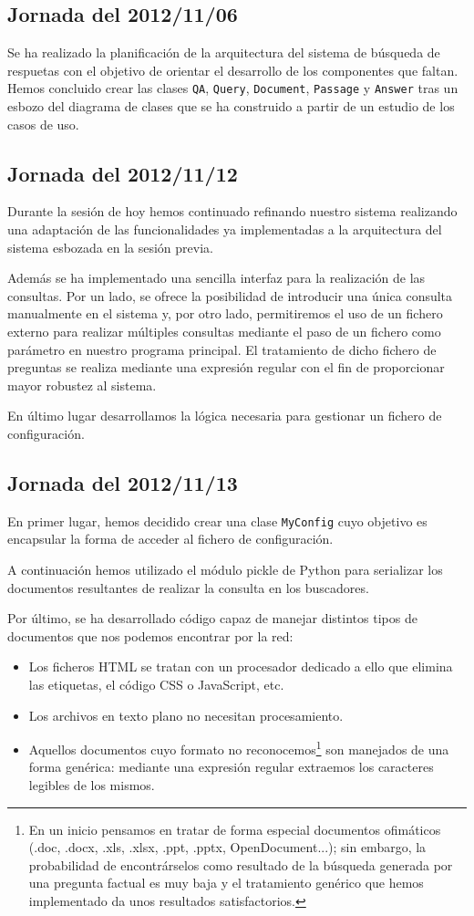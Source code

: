 \documentclass[12pt,a4paper,titlepage]{article}
\begin{document}
\subsection{Jornada del 2012/11/06}
Se ha realizado la planificación de la arquitectura del sistema de búsqueda de respuetas con el objetivo de orientar el desarrollo de los componentes que faltan. Hemos concluido crear las clases \texttt{QA}, \texttt{Query}, \texttt{Document}, \texttt{Passage} y \texttt{Answer} tras un esbozo del diagrama de clases que se ha construido a partir de un estudio de los casos de uso.

\subsection{Jornada del 2012/11/12}
Durante la sesión de hoy hemos continuado refinando nuestro sistema realizando una adaptación de las funcionalidades ya implementadas a la arquitectura del sistema esbozada en la sesión previa.

Además se ha implementado una sencilla interfaz para la realización de las consultas. Por un lado, se ofrece la posibilidad de introducir una única consulta manualmente en el sistema y, por otro lado, permitiremos el uso de un fichero externo para realizar múltiples consultas mediante el paso de un fichero como parámetro en nuestro programa principal. El tratamiento de dicho fichero de preguntas se realiza mediante una expresión regular con el fin de proporcionar mayor robustez al sistema.

En último lugar desarrollamos la lógica necesaria para gestionar un fichero de configuración.

\subsection{Jornada del 2012/11/13}
En primer lugar, hemos decidido crear una clase \texttt{MyConfig} cuyo objetivo es encapsular la forma de acceder al fichero de configuración.

A continuación hemos utilizado el módulo pickle de Python para serializar los documentos resultantes de realizar la consulta en los buscadores.

Por último, se ha desarrollado código capaz de manejar distintos tipos de documentos que nos podemos encontrar por la red:
\begin{itemize}
\item Los ficheros HTML se tratan con un procesador dedicado a ello que elimina las etiquetas, el código CSS o JavaScript, etc.
\item Los archivos en texto plano no necesitan procesamiento.
\item Aquellos documentos cuyo formato no reconocemos\footnote{En un inicio pensamos en tratar de forma especial documentos ofimáticos (.doc, .docx, .xls, .xlsx, .ppt, .pptx, OpenDocument...); sin embargo, la probabilidad de encontrárselos como resultado de la búsqueda generada por una pregunta factual es muy baja y el tratamiento genérico que hemos implementado da unos resultados satisfactorios.} son manejados de una forma genérica: mediante una expresión regular extraemos los caracteres legibles de los mismos.
\end{itemize}
\end{document}
